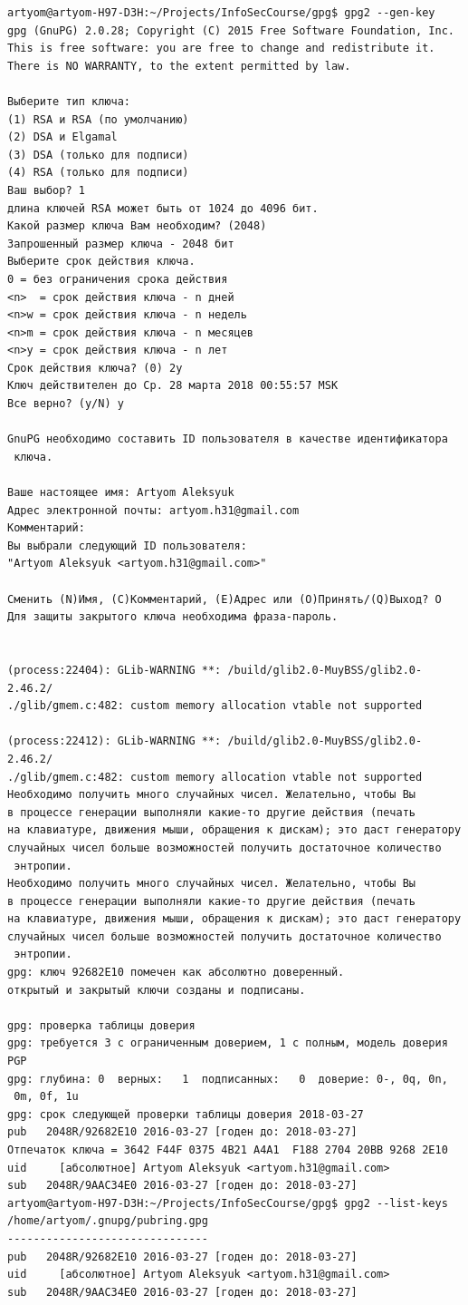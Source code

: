 \begin{verbatim}
artyom@artyom-H97-D3H:~/Projects/InfoSecCourse/gpg$ gpg2 --gen-key
gpg (GnuPG) 2.0.28; Copyright (C) 2015 Free Software Foundation, Inc.
This is free software: you are free to change and redistribute it.
There is NO WARRANTY, to the extent permitted by law.

Выберите тип ключа:
(1) RSA и RSA (по умолчанию)
(2) DSA и Elgamal
(3) DSA (только для подписи)
(4) RSA (только для подписи)
Ваш выбор? 1
длина ключей RSA может быть от 1024 до 4096 бит.
Какой размер ключа Вам необходим? (2048) 
Запрошенный размер ключа - 2048 бит
Выберите срок действия ключа.
0 = без ограничения срока действия
<n>  = срок действия ключа - n дней
<n>w = срок действия ключа - n недель
<n>m = срок действия ключа - n месяцев
<n>y = срок действия ключа - n лет
Срок действия ключа? (0) 2y
Ключ действителен до Ср. 28 марта 2018 00:55:57 MSK
Все верно? (y/N) y

GnuPG необходимо составить ID пользователя в качестве идентификатора
 ключа.

Ваше настоящее имя: Artyom Aleksyuk
Адрес электронной почты: artyom.h31@gmail.com
Комментарий: 
Вы выбрали следующий ID пользователя:
"Artyom Aleksyuk <artyom.h31@gmail.com>"

Сменить (N)Имя, (C)Комментарий, (E)Адрес или (O)Принять/(Q)Выход? O
Для защиты закрытого ключа необходима фраза-пароль.


(process:22404): GLib-WARNING **: /build/glib2.0-MuyBSS/glib2.0-2.46.2/
./glib/gmem.c:482: custom memory allocation vtable not supported

(process:22412): GLib-WARNING **: /build/glib2.0-MuyBSS/glib2.0-2.46.2/
./glib/gmem.c:482: custom memory allocation vtable not supported
Необходимо получить много случайных чисел. Желательно, чтобы Вы
в процессе генерации выполняли какие-то другие действия (печать
на клавиатуре, движения мыши, обращения к дискам); это даст генератору
случайных чисел больше возможностей получить достаточное количество
 энтропии.
Необходимо получить много случайных чисел. Желательно, чтобы Вы
в процессе генерации выполняли какие-то другие действия (печать
на клавиатуре, движения мыши, обращения к дискам); это даст генератору
случайных чисел больше возможностей получить достаточное количество
 энтропии.
gpg: ключ 92682E10 помечен как абсолютно доверенный.
открытый и закрытый ключи созданы и подписаны.

gpg: проверка таблицы доверия
gpg: требуется 3 с ограниченным доверием, 1 с полным, модель доверия PGP
gpg: глубина: 0  верных:   1  подписанных:   0  доверие: 0-, 0q, 0n,
 0m, 0f, 1u
gpg: срок следующей проверки таблицы доверия 2018-03-27
pub   2048R/92682E10 2016-03-27 [годен до: 2018-03-27]
Отпечаток ключа = 3642 F44F 0375 4B21 A4A1  F188 2704 20BB 9268 2E10
uid     [абсолютное] Artyom Aleksyuk <artyom.h31@gmail.com>
sub   2048R/9AAC34E0 2016-03-27 [годен до: 2018-03-27]
artyom@artyom-H97-D3H:~/Projects/InfoSecCourse/gpg$ gpg2 --list-keys
/home/artyom/.gnupg/pubring.gpg
-------------------------------
pub   2048R/92682E10 2016-03-27 [годен до: 2018-03-27]
uid     [абсолютное] Artyom Aleksyuk <artyom.h31@gmail.com>
sub   2048R/9AAC34E0 2016-03-27 [годен до: 2018-03-27]
\end{verbatim}

